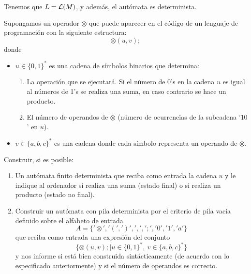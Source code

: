 \begin{ejercicio}
\begin{enumerate}
        Tenemos que $L=\mathcal{L}(M)$, y además, el autómata es determinista.
    \end{enumerate}
\end{ejercicio}

\begin{ejercicio}\label{ej:1.5.24}
    Supongamos un operador $\otimes$ que puede aparecer en el código de un lenguaje de programación con la siguiente estructura:
    \begin{equation*}
        \otimes(u,v);
    \end{equation*}
    donde
    \begin{itemize}
        \item $u\in {\{0,1\}}^{\ast}$ es una cadena de símbolos binarios que determina:
            \begin{enumerate}
                \item La operación que se ejecutará. Si el número de 0's en la cadena $u$ es igual al números de 1's se realiza una suma, en caso contrario se hace un producto.
                \item El número de operandos de $\otimes$ (número de ocurrencias de la subcadena '$10$' en $u$).
            \end{enumerate}
        \item $v\in {\{a,b,c\}}^{\ast}$ es una cadena donde cada símbolo representa un operando de $\otimes$.
    \end{itemize}
    Construir, si es posible:
    \begin{enumerate}
        \item Un autómata finito determinista que reciba como entrada la cadena $u$ y le indique al ordenador si realiza una suma (estado final) o si realiza un producto (estado no final).
        \item Construir un autómata con pila determinista por el criterio de pila vacía definido sobre el alfabeto de entrada
            \begin{equation*}
                A = \{'\otimes', '(', ')', ',', ';', '0', '1', 'a'\}
            \end{equation*}
            que reciba como entrada una expresión del conjunto
            \begin{equation*}
                \{\otimes(u,v); \mid u\in {\{0,1\}}^{\ast},\ v\in {\{a,b,c\}}^{\ast}\}
            \end{equation*}
            y nos informe si está bien construida sintácticamente (de acuerdo con lo especificado anteriormente) y si el número de operandos es correcto.
    \end{enumerate}

\end{ejercicio}

